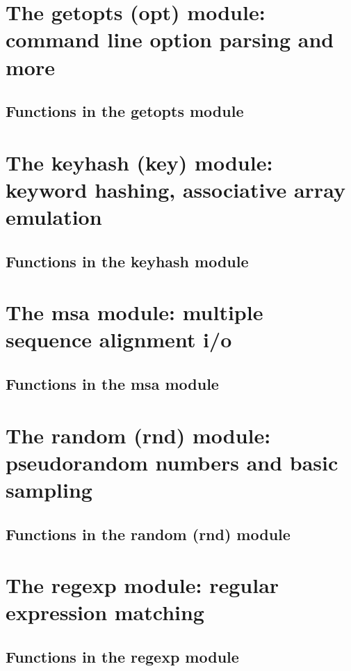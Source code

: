 \documentclass[11pt]{article}
\begin{document}
\newpage
\section{The getopts (opt) module: command line option parsing and more}

\subsection{Functions in the getopts module}


\newpage
\section{The keyhash (key) module: keyword hashing, associative array emulation}

\subsection{Functions in the keyhash module}


\newpage
\section{The msa module: multiple sequence alignment i/o}

\subsection{Functions in the msa module}


\newpage
\section{The random (rnd) module: pseudorandom numbers and basic sampling}

\subsection{Functions in the random (rnd) module}


\newpage
\section{The regexp module: regular expression matching}

\subsection{Functions in the regexp module}

\end{document}
